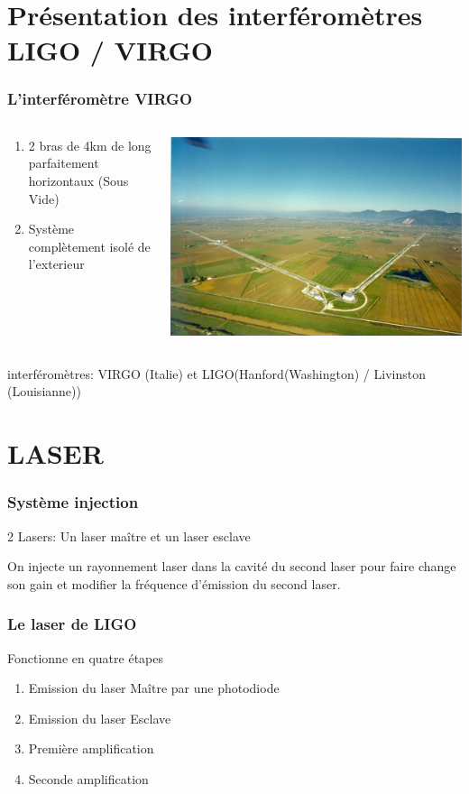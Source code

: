 \documentclass{beamer}
\begin{document}
\section{Présentation des interféromètres LIGO / VIRGO}
\begin{frame}
	\frametitle{L'interféromètre VIRGO}
	\begin{columns}
		\begin{column}{0.5\textwidth}
			\small
			\begin{enumerate}[-]
				\item 2 bras de 4km de long parfaitement horizontaux (Sous Vide)
				\item Système complètement isolé de l'exterieur
			\end{enumerate}
		\end{column}
		\begin{column}{0.5\textwidth}
			\includegraphics[scale=.5]{Docs/virgoview.png}
		\end{column}
	\end{columns}
	 interféromètres: VIRGO (Italie) et LIGO(Hanford(Washington) / Livinston (Louisianne))
\end{frame}
\section{LASER}


\begin{frame}
	\frametitle{Système injection}
	2 Lasers: Un laser maître et un laser esclave
	\break

	On injecte un rayonnement laser dans la cavité du second laser pour faire change son gain et modifier la fréquence d'émission du second laser.
\end{frame}

\begin{frame}
	\frametitle{Le laser de LIGO}
	Fonctionne en quatre étapes
	\begin{enumerate}[1.]
		\item Emission du laser Maître par une photodiode
		\item Emission du laser Esclave
		\item Première amplification
		\item Seconde amplification 
	\end{enumerate}
\end{frame}
\end{document}
